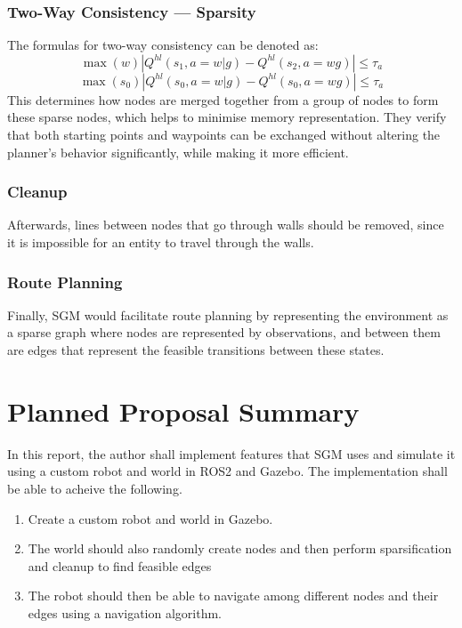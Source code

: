 \documentclass[conference]{IEEEtran}
\begin{document}
\subsubsection{Two-Way Consistency --- Sparsity}
The formulas for two-way consistency can be denoted as:
\begin{equation}
  \max(w) \left| Q^{hl}(s_1, a=w | g) - Q^{hl}(s_2, a=wg) \right| \leq \tau_a
  \label{1}
\end{equation}
\begin{equation}
  \max(s_0) \left| Q^{hl}(s_0, a=w | g) - Q^{hl}(s_0, a=wg) \right| \leq \tau_a
  \label{2}
\end{equation}
This determines how nodes are merged together from a group of nodes to form these sparse nodes, which helps to minimise memory representation. They verify that both starting points and waypoints can be exchanged without altering the planner's behavior significantly, while making it more efficient.

\subsubsection{Cleanup}
Afterwards, lines between nodes that go through walls should be removed, since it is impossible for an entity to travel through the walls.

\subsubsection{Route Planning}
Finally, SGM would facilitate route planning by representing the environment as a sparse graph where nodes are represented by observations, and between them are edges that represent the feasible transitions between these states.


\section{Planned Proposal Summary}

In this report, the author shall implement features that SGM uses and simulate it using a custom robot and world in ROS2 and Gazebo.
The implementation shall be able to acheive the following.
\begin{enumerate}
  \item Create a custom robot and world in Gazebo.
  \item The world should also randomly create nodes and then perform sparsification and cleanup to find feasible edges
  \item The robot should then be able to navigate among different nodes and their edges using a navigation algorithm.
\end{enumerate}
\end{document}
